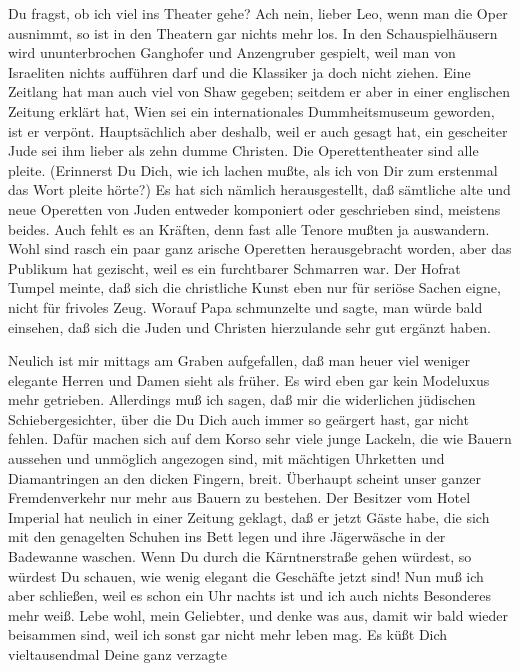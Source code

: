 Du fragst, ob ich viel ins Theater gehe? Ach nein,
lieber Leo, wenn man die Oper ausnimmt, so ist in den Theatern gar
nichts mehr los. In den Schauspielhäusern wird ununterbrochen
Ganghofer und Anzengruber gespielt, weil man von Israeliten nichts
aufführen darf und die Klassiker ja doch nicht ziehen. Eine
Zeitlang hat man auch viel von Shaw gegeben; seitdem er aber in
einer englischen Zeitung erklärt hat, Wien sei ein internationales
Dummheitsmuseum geworden, ist er verpönt. Hauptsächlich aber
deshalb, weil er auch gesagt hat, ein gescheiter Jude sei ihm
lieber als zehn dumme Christen. Die Operettentheater sind alle
pleite. (Erinnerst Du Dich, wie ich lachen mußte, als ich von Dir
zum erstenmal das Wort pleite hörte?) Es hat sich nämlich
herausgestellt, daß sämtliche alte und neue Operetten von Juden
entweder komponiert oder geschrieben sind, meistens beides. Auch
fehlt es an Kräften, denn fast alle Tenore mußten ja auswandern.
Wohl sind rasch ein paar ganz arische Operetten herausgebracht
worden, aber das Publikum hat gezischt, weil es ein furchtbarer
Schmarren war. Der Hofrat Tumpel meinte, daß sich die christliche
Kunst eben nur für seriöse Sachen eigne, nicht für frivoles Zeug.
Worauf Papa schmunzelte und sagte, man würde bald einsehen, daß
sich die Juden und Christen hierzulande sehr gut ergänzt haben.

Neulich ist mir mittags am Graben aufgefallen, daß man heuer viel
weniger elegante Herren und Damen sieht als früher. Es wird eben
gar kein Modeluxus mehr getrieben. Allerdings muß ich sagen, daß
mir die widerlichen jüdischen Schiebergesichter, über die Du Dich
auch immer so  geärgert hast, gar nicht fehlen.
Dafür machen sich auf dem Korso sehr viele junge Lackeln, die wie
Bauern aussehen und unmöglich angezogen sind, mit mächtigen
Uhrketten und Diamantringen an den dicken Fingern, breit.
Überhaupt scheint unser ganzer Fremdenverkehr nur mehr aus Bauern
zu bestehen. Der Besitzer vom Hotel Imperial hat neulich in einer
Zeitung geklagt, daß er jetzt Gäste habe, die sich mit den
genagelten Schuhen ins Bett legen und ihre Jägerwäsche in der
Badewanne waschen. Wenn Du durch die Kärntnerstraße gehen würdest,
so würdest Du schauen, wie wenig elegant die Geschäfte jetzt sind!
Nun muß ich aber schließen, weil es schon ein Uhr nachts ist und
ich auch nichts Besonderes mehr weiß. Lebe wohl, mein Geliebter,
und denke was aus, damit wir bald wieder beisammen sind, weil ich
sonst gar nicht mehr leben mag. Es küßt Dich vieltausendmal Deine
ganz verzagte


